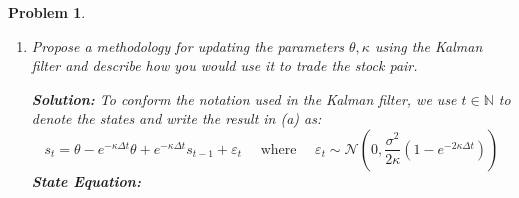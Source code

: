 \documentclass[11pt]{article}
\theoremstyle{plain} %
\newtheorem{problem}[theorem]{Problem}
\newenvironment{solution}
{\color{C2}\normalfont\begin{framed}\begingroup\textbf{Solution:} }
  {\endgroup\end{framed}}
\theoremstyle{remark}
\begin{document}
\begin{problem}
\begin{enumerate}[label=(\alph*)]
\begin{solution}
\begin{align*}
            \mathbb{V}\left[s_n \mid s_{n-1}\right]
             & = \mathbb{V}\left[\theta - e^{-\kappa\Delta t}\theta + e^{-\kappa\Delta t} s_{n-1} + e^{-\kappa n\Delta t}\int_{(n-1)\Delta t}^{n\Delta t} e^{\kappa s}\sigma d B_s \mid s_{n-1}\right]
            = \mathbb{V}\left[e^{-\kappa n\Delta t}\int_{(n-1)\Delta t}^{n\Delta t} e^{\kappa s}\sigma d B_s \right]
            = \frac{\sigma^2}{2\kappa} \left(1-e^{-2\kappa \Delta t}\right) = \mathbb{V}\left[\varepsilon_n \right]
          \end{align*}
          Therefore, we have
          $$
            s_n = \mathbb{E}\left[s_n \mid s_{n-1}\right] + \varepsilon_n
          $$
          where $\varepsilon_n$ is a random process with zero
          mean and variance equal to $\sigma_{\varepsilon,
              n}^2=\mathbb{V}\left[s_n \mid s_{n-1}\right] = \frac{\sigma^2}{2\kappa} \left(1-e^{-2\kappa \Delta t}\right)$.

        \end{solution}
  \item Propose a methodology for updating the parameters $\theta, \kappa$ using
        the Kalman filter and describe how you would use it to trade the stock pair.

        \begin{solution}
          To conform the notation used in the Kalman filter, we use $t\in
            \mathbb{N}$ to denote the states and write the result in (a) as:
          $$
            s_t = \theta - e^{-\kappa\Delta t}\theta + e^{-\kappa\Delta t} s_{t-1} + \varepsilon_t \quad  \text{ where } \quad  \varepsilon_t \sim \mathcal{N}\left(0, \frac{\sigma^2}{2\kappa} \left(1-e^{-2\kappa \Delta t}\right)\right)
          $$
          \textbf{State Equation:}


\end{solution}
\end{enumerate}
\end{problem}
\end{document}
